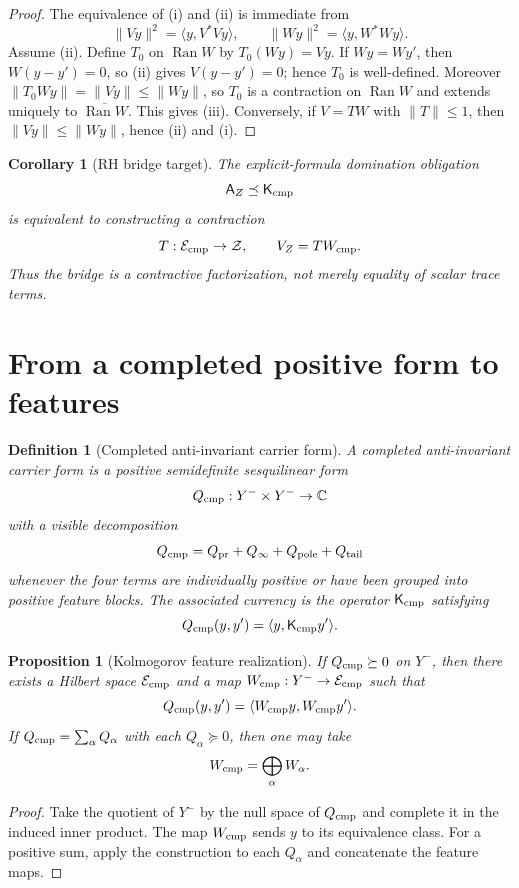\documentclass[11pt]{article}
\newtheorem{proposition}{Proposition}
\newtheorem{definition}{Definition}
\newtheorem{corollary}{Corollary}
\DeclareMathOperator{\Ran}{Ran}
\newcommand{\Kcmp}{\mathsf K_{\rm cmp}}
\newcommand{\AZ}{\mathsf A_Z}
\newcommand{\Ecmp}{\mathcal E_{\rm cmp}}
\begin{document}
\begin{proof}
The equivalence of (i) and (ii) is immediate from
\[
   \|Vy\|^2=\langle y,V^*Vy\rangle,
   \qquad
   \|Wy\|^2=\langle y,W^*Wy\rangle.
\]
Assume (ii).  Define $T_0$ on $\Ran W$ by $T_0(Wy)=Vy$.  If $Wy=Wy'$, then $W(y-y')=0$, so (ii) gives $V(y-y')=0$; hence $T_0$ is well-defined.  Moreover $\|T_0Wy\|=\|Vy\|\le\|Wy\|$, so $T_0$ is a contraction on $\Ran W$ and extends uniquely to $\overline{\Ran W}$.  This gives (iii).  Conversely, if $V=TW$ with $\|T\|\le1$, then $\|Vy\|\le\|Wy\|$, hence (ii) and (i).
\end{proof}

\begin{corollary}[RH bridge target]
The explicit-formula domination obligation
\[
   \AZ\preceq\Kcmp
\]
is equivalent to constructing a contraction
\[
   T:\Ecmp\to\mathcal Z,
   \qquad
   V_Z=T W_{\rm cmp}.
\]
Thus the bridge is a contractive factorization, not merely equality of scalar trace terms.
\end{corollary}

\section{From a completed positive form to features}
\begin{definition}[Completed anti-invariant carrier form]
A completed anti-invariant carrier form is a positive semidefinite sesquilinear form
\[
   Q_{\rm cmp}:Y^-\times Y^-\to\mathbb C
\]
with a visible decomposition
\[
   Q_{\rm cmp}=Q_{\rm pr}+Q_\infty+Q_{\rm pole}+Q_{\rm tail}
\]
whenever the four terms are individually positive or have been grouped into positive feature blocks.  The associated currency is the operator $\Kcmp$ satisfying
\[
   Q_{\rm cmp}(y,y')=\langle y,\Kcmp y'\rangle.
\]
\end{definition}

\begin{proposition}[Kolmogorov feature realization]
If $Q_{\rm cmp}\succeq0$ on $Y^-$, then there exists a Hilbert space $\Ecmp$ and a map $W_{\rm cmp}:Y^-\to\Ecmp$ such that
\[
   Q_{\rm cmp}(y,y')=\langle W_{\rm cmp}y,W_{\rm cmp}y'\rangle.
\]
If $Q_{\rm cmp}=\sum_\alpha Q_\alpha$ with each $Q_\alpha\succeq0$, then one may take
\[
   W_{\rm cmp}=\bigoplus_\alpha W_\alpha.
\]
\end{proposition}

\begin{proof}
Take the quotient of $Y^-$ by the null space of $Q_{\rm cmp}$ and complete it in the induced inner product.  The map $W_{\rm cmp}$ sends $y$ to its equivalence class.  For a positive sum, apply the construction to each $Q_\alpha$ and concatenate the feature maps.
\end{proof}
\end{document}
